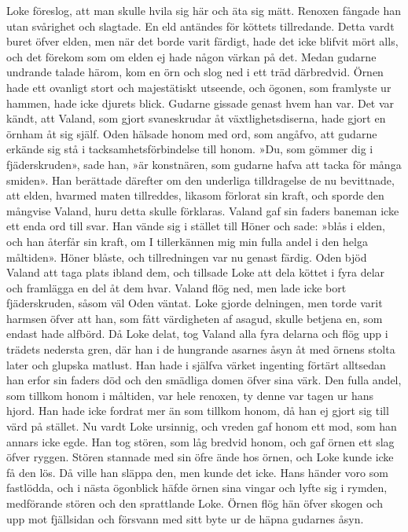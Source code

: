 Loke föreslog, att man skulle hvila sig här och äta sig mätt. Renoxen
fångade han utan svårighet och slagtade. En eld antändes för köttets
tillredande. Detta vardt buret öfver elden, men när det borde varit
färdigt, hade det icke blifvit mört alls, och det förekom som om elden
ej hade någon värkan på det. Medan gudarne undrande talade härom, kom en
örn och slog ned i ett träd därbredvid. Örnen hade ett ovanligt stort
och majestätiskt utseende, och ögonen, som framlyste ur hammen, hade
icke djurets blick. Gudarne gissade genast hvem han var. Det var kändt,
att Valand, som gjort svaneskrudar åt växtlighetsdiserna, hade gjort en
örnham åt sig själf. Oden hälsade honom med ord, som angåfvo, att
gudarne erkände sig stå i tacksamhetsförbindelse till honom. »Du, som
gömmer dig i fjäderskruden», sade han, »är konstnären, som gudarne hafva
att tacka för många smiden». Han berättade därefter om den underliga
tilldragelse de nu bevittnade, att elden, hvarmed maten tillreddes,
likasom förlorat sin kraft, och sporde den mångvise Valand, huru detta
skulle förklaras. Valand gaf sin faders baneman icke ett enda ord till
svar. Han vände sig i stället till Höner och sade: »blås i elden, och
han återfår sin kraft, om I tillerkännen mig min fulla andel i den helga
måltiden». Höner blåste, och tillredningen var nu genast färdig. Oden
bjöd Valand att taga plats ibland dem, och tillsade Loke att dela köttet
i fyra delar och framlägga en del åt dem hvar. Valand flög ned, men lade
icke bort fjäderskruden, såsom väl Oden väntat. Loke gjorde delningen,
men torde varit harmsen öfver att han, som fått värdigheten af asagud,
skulle betjena en, som endast hade alfbörd. Då Loke delat, tog Valand
alla fyra delarna och
\protect\hypertarget{lb1625905.xhtmlux5cux23start77}{}{}\protect\hypertarget{lb1625905.xhtmlux5cux23start77-a}{}{}\protect\hypertarget{lb1625905.xhtmlux5cux23start77-b}{}{}\protect\hypertarget{lb1625905.xhtmlux5cux23start77-c}{}{}\protect\hypertarget{lb1625905.xhtmlux5cux23start77-d}{}{}
flög upp i trädets nedersta gren, där han i de hungrande asarnes åsyn åt
med örnens stolta later och glupska matlust. Han hade i själfva värket
ingenting förtärt alltsedan han erfor sin faders död och den smädliga
domen öfver sina värk. Den fulla andel, som tillkom honom i måltiden,
var hele renoxen, ty denne var tagen ur hans hjord. Han hade icke
fordrat mer än som tillkom honom, då han ej gjort sig till värd på
stället. Nu vardt Loke ursinnig, och vreden gaf honom ett mod, som han
annars icke egde. Han tog stören, som låg bredvid honom, och gaf örnen
ett slag öfver ryggen. Stören stannade med sin öfre ände hos örnen, och
Loke kunde icke få den lös. Då ville han släppa den, men kunde det icke.
Hans händer voro som fastlödda, och i nästa ögonblick häfde örnen sina
vingar och lyfte sig i rymden, medförande stören och den sprattlande
Loke. Örnen flög hän öfver skogen och upp mot fjällsidan och försvann
med sitt byte ur de häpna gudarnes åsyn.

